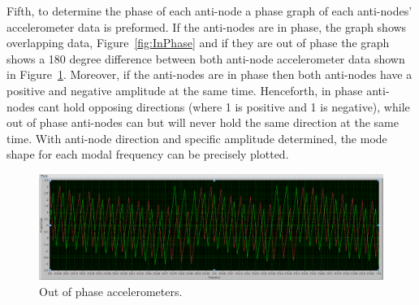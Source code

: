 \documentclass[12pt,letter]{article}
\numberwithin{ex}{section} %
\numberwithin{re}{section} %
\begin{document}
Fifth, to determine the phase of each anti-node a phase graph of each anti-nodes' accelerometer data is preformed. If the anti-nodes are in phase, the graph shows overlapping data, Figure~\ref{fig:InPhase} and if they are out of phase the graph shows a 180 degree difference between both anti-node accelerometer data shown in Figure~\ref{fig:OutofPhase}. Moreover, if the anti-nodes are in phase then both anti-nodes have a positive and negative amplitude at the same time. Henceforth, in phase anti-nodes cant hold opposing directions (where 1 is positive and 1 is negative), while out of phase anti-nodes can but will never hold the same direction at the same time. With anti-node direction and specific amplitude determined, the mode shape for each modal frequency can be precisely plotted. 

\begin{figure}[h]
	\centering 
	\includegraphics*[width= 1\linewidth]{figures/OutofPhase/OutofPhase.png}
	\vspace{0.1cm}
	\caption{Out of phase accelerometers.}
	\label{fig:OutofPhase}
\end{figure}
\end{document}
